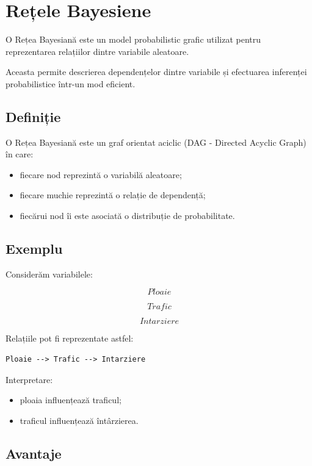 \documentclass[12pt,a4paper]{article}
\begin{document}
\section{Rețele Bayesiene}

O Rețea Bayesiană este un model probabilistic grafic utilizat pentru reprezentarea relațiilor dintre variabile aleatoare.

Aceasta permite descrierea dependențelor dintre variabile și efectuarea inferenței probabilistice într-un mod eficient.

\subsection{Definiție}

O Rețea Bayesiană este un graf orientat aciclic (DAG - Directed Acyclic Graph) în care:

\begin{itemize}
\item fiecare nod reprezintă o variabilă aleatoare;
\item fiecare muchie reprezintă o relație de dependență;
\item fiecărui nod îi este asociată o distribuție de probabilitate.
\end{itemize}

\subsection{Exemplu}

Considerăm variabilele:

\[
Ploaie
\]

\[
Trafic
\]

\[
Intarziere
\]

Relațiile pot fi reprezentate astfel:

\begin{verbatim}
Ploaie --> Trafic --> Intarziere
\end{verbatim}

Interpretare:

\begin{itemize}
\item ploaia influențează traficul;
\item traficul influențează întârzierea.
\end{itemize}

\subsection{Avantaje}
\end{document}
